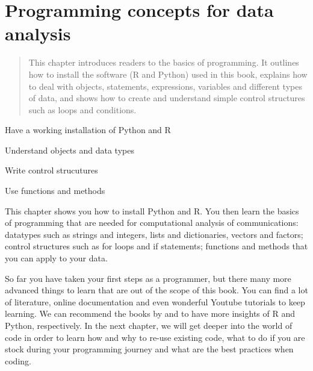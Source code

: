 \chapter{Programming concepts for data analysis}
\label{chap:programmingconcepts}

\begin{abstract}This chapter introduces readers to the basics of programming. It
outlines how to install the software (R and Python) used in this book,
explains how to deal with objects, statements, expressions, variables
and different types of data, and shows how to create and understand
simple control structures such as loops and conditions.
\end{abstract}


\begin{objectives}
\item Have a working installation of Python and R
\item Understand objects and data types
\item Write control strucutures
\item Use functions and methods
\end{objectives}

\begin{feature}
This chapter shows you how to install Python and R. You then learn the
basics of programming that are needed for computational analysis of
communications: datatypes such as strings and integers, lists and
dictionaries, vectors and factors; control structures such as for
loops and if statements; functions and methods that you can apply to
your data.

\end{feature}










So far you have taken your first steps as a programmer, but there many
more advanced things to learn that are out of the scope of this
book. You can find a lot of literature, online documentation and even
wonderful Youtube tutorials to keep learning. We can recommend the
books by \cite{crawley2012r} and \cite{vanderplas2016python} to have
more insights of R and Python, respectively. In the next chapter, we
will get deeper into the world of code in order to learn how and why
to re-use existing code, what to do if you are stock during your
programming journey and what are the best practices when coding.

